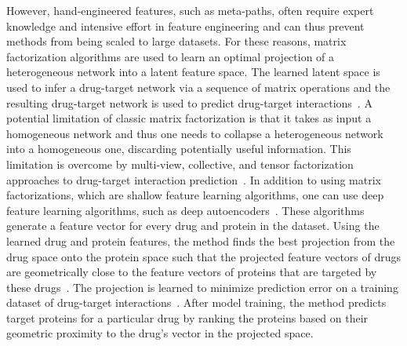 \documentclass[5p]{elsarticle}
\newcommand{\rev}[1]{{\color{black}#1}}
\begin{document}
However, hand-engineered features, such as meta-paths, often require expert knowledge and intensive effort in feature engineering and can thus prevent methods from being scaled to large datasets.
For these reasons, matrix factorization algorithms are used to learn an optimal projection of a heterogeneous network into a latent feature space.
The learned latent space \rev{is used to infer a} drug-target network via a sequence of matrix operations and the resulting drug-target network is used to predict drug-target interactions~\cite{Zheng2013collaborative}.
A potential limitation of \rev{classic matrix} factorization is that \rev{it} takes as input a homogeneous network and thus one needs to collapse a heterogeneous network into a homogeneous one, discarding potentially useful information.
This limitation is overcome by multi-view, collective, and tensor factorization approaches to drug-target interaction prediction~\cite{Gonen2013kernelized,Narita2012tensor,Zitnik2016collective}.
In addition to \rev{using matrix factorizations, which are shallow feature learning algorithms,} one can use deep feature learning algorithms, such as deep autoencoders~\cite{Hinton2006reducing}\rev{.}
These algorithms generate a feature vector for every drug and protein in the dataset.
Using the learned drug and protein features, the method finds the best projection from the drug space onto the protein space such that the projected feature vectors of drugs are geometrically close to the feature vectors of proteins that are targeted by these drugs~\cite{Zong2017deep}.
The projection is learned to minimize prediction error on a training dataset of drug-target interactions~\cite{Luo2017network}.
After model training, the method predicts target proteins for a particular drug by ranking the proteins based on their geometric proximity to the drug's vector in the projected space.
\end{document}
